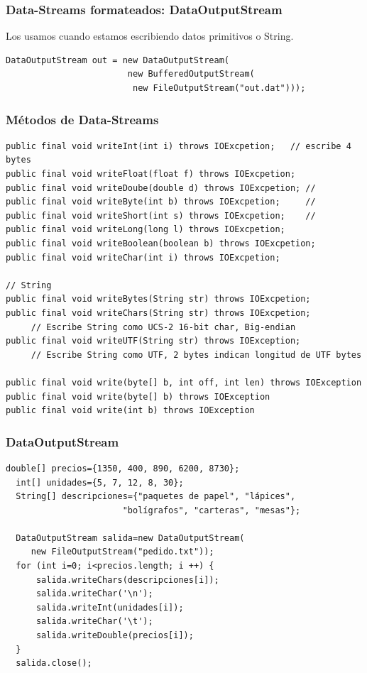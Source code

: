\documentclass{beamer}
\begin{document}
\begin{frame}[fragile]
\frametitle{Data-Streams formateados: DataOutputStream}
Los usamos cuando estamos escribiendo datos primitivos o String.
\pause
\begin{verbatim}
DataOutputStream out = new DataOutputStream(
                        new BufferedOutputStream(
                         new FileOutputStream("out.dat")));
\end{verbatim}
\end{frame}

\begin{frame}[fragile]
\frametitle{Métodos de Data-Streams}
\begin{tiny}
\begin{verbatim}
public final void writeInt(int i) throws IOExcpetion;   // escribe 4 bytes
public final void writeFloat(float f) throws IOExcpetion;
public final void writeDoube(double d) throws IOExcpetion; // 
public final void writeByte(int b) throws IOExcpetion;     // 
public final void writeShort(int s) throws IOExcpetion;    // 
public final void writeLong(long l) throws IOExcpetion;
public final void writeBoolean(boolean b) throws IOExcpetion;
public final void writeChar(int i) throws IOExcpetion;
 
// String
public final void writeBytes(String str) throws IOExcpetion;  
public final void writeChars(String str) throws IOExcpetion;
     // Escribe String como UCS-2 16-bit char, Big-endian 
public final void writeUTF(String str) throws IOException;   
     // Escribe String como UTF, 2 bytes indican longitud de UTF bytes 

public final void write(byte[] b, int off, int len) throws IOException
public final void write(byte[] b) throws IOException
public final void write(int b) throws IOException 
\end{verbatim}
\end{tiny}
\end{frame}

\begin{frame}[fragile]
\frametitle{DataOutputStream}
\begin{verbatim}
double[] precios={1350, 400, 890, 6200, 8730};
  int[] unidades={5, 7, 12, 8, 30};
  String[] descripciones={"paquetes de papel", "lápices", 
                       "bolígrafos", "carteras", "mesas"};

  DataOutputStream salida=new DataOutputStream(
     new FileOutputStream("pedido.txt"));
  for (int i=0; i<precios.length; i ++) {
      salida.writeChars(descripciones[i]);
      salida.writeChar('\n');
      salida.writeInt(unidades[i]);
      salida.writeChar('\t');
      salida.writeDouble(precios[i]);
  }
  salida.close();
\end{verbatim}
\end{frame}
\end{document}
